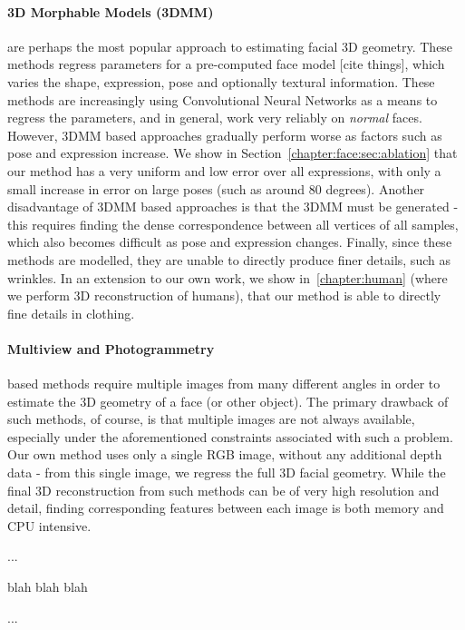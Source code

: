 \paragraph{3D Morphable Models (3DMM)} are perhaps the most popular
approach to estimating facial 3D geometry. These methods regress
parameters for a pre-computed face model [cite things], which varies
the shape, expression, pose and optionally textural information. These
methods are increasingly using Convolutional Neural Networks as a
means to regress the parameters, and in general, work very reliably on
\textit{normal} faces. However, 3DMM based approaches gradually
perform worse as factors such as pose and expression increase. We show
in Section~\ref{chapter:face:sec:ablation} that our method has a very
uniform and low error over all expressions, with only a small increase
in error on large poses (such as around 80 degrees). Another
disadvantage of 3DMM based approaches is that the 3DMM must be
generated - this requires finding the dense correspondence between all
vertices of all samples, which also becomes difficult as pose and
expression changes. Finally, since these methods are modelled, they
are unable to directly produce finer details, such as wrinkles. In an
extension to our own work, we show in~\ref{chapter:human} (where we
perform 3D reconstruction of humans), that our method is able to
directly fine details in clothing.


\paragraph{Multiview and Photogrammetry} based methods require
multiple images from many different angles in order to estimate the 3D
geometry of a face (or other object). The primary drawback of such
methods, of course, is that multiple images are not always available,
especially under the aforementioned constraints associated with such a
problem. Our own method uses only a single RGB image, without any
additional depth data - from this single image, we regress the full 3D
facial geometry. While the final 3D reconstruction from such methods
can be of very high resolution and detail, finding corresponding
features between each image is both memory and CPU intensive. 

...


blah blah blah


...




